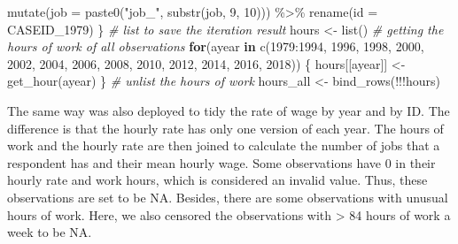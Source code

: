 \documentclass[12pt]{article}
\newenvironment{Shaded}{\begin{snugshade}}{\end{snugshade}}
\newcommand{\AttributeTok}[1]{\textcolor[rgb]{0.77,0.63,0.00}{#1}}
\newcommand{\CommentTok}[1]{\textcolor[rgb]{0.56,0.35,0.01}{\textit{#1}}}
\newcommand{\ControlFlowTok}[1]{\textcolor[rgb]{0.13,0.29,0.53}{\textbf{#1}}}
\newcommand{\DecValTok}[1]{\textcolor[rgb]{0.00,0.00,0.81}{#1}}
\newcommand{\FunctionTok}[1]{\textcolor[rgb]{0.00,0.00,0.00}{#1}}
\newcommand{\NormalTok}[1]{#1}
\newcommand{\OtherTok}[1]{\textcolor[rgb]{0.56,0.35,0.01}{#1}}
\newcommand{\SpecialCharTok}[1]{\textcolor[rgb]{0.00,0.00,0.00}{#1}}
\newcommand{\StringTok}[1]{\textcolor[rgb]{0.31,0.60,0.02}{#1}}
\begin{document}
\begin{Shaded}
\begin{Highlighting}[]
    \FunctionTok{mutate}\NormalTok{(}\AttributeTok{job =} \FunctionTok{paste0}\NormalTok{(}\StringTok{"job\_"}\NormalTok{, }\FunctionTok{substr}\NormalTok{(job, }\DecValTok{9}\NormalTok{, }\DecValTok{10}\NormalTok{))) }\SpecialCharTok{\%\textgreater{}\%}
    \FunctionTok{rename}\NormalTok{(}\AttributeTok{id =}\NormalTok{ CASEID\_1979)}
\NormalTok{\}}
\CommentTok{\# list to save the iteration result}
\NormalTok{hours }\OtherTok{\textless{}{-}} \FunctionTok{list}\NormalTok{()}
\CommentTok{\# getting the hours of work of all observations}
\ControlFlowTok{for}\NormalTok{(ayear }\ControlFlowTok{in} \FunctionTok{c}\NormalTok{(}\DecValTok{1979}\SpecialCharTok{:}\DecValTok{1994}\NormalTok{, }\DecValTok{1996}\NormalTok{, }\DecValTok{1998}\NormalTok{, }\DecValTok{2000}\NormalTok{, }\DecValTok{2002}\NormalTok{, }\DecValTok{2004}\NormalTok{, }\DecValTok{2006}\NormalTok{, }\DecValTok{2008}\NormalTok{, }\DecValTok{2010}\NormalTok{,}
               \DecValTok{2012}\NormalTok{, }\DecValTok{2014}\NormalTok{, }\DecValTok{2016}\NormalTok{, }\DecValTok{2018}\NormalTok{)) \{}
\NormalTok{  hours[[ayear]] }\OtherTok{\textless{}{-}} \FunctionTok{get\_hour}\NormalTok{(ayear)}
\NormalTok{\}}
\CommentTok{\# unlist the hours of work}
\NormalTok{hours\_all }\OtherTok{\textless{}{-}} \FunctionTok{bind\_rows}\NormalTok{(}\SpecialCharTok{!!!}\NormalTok{hours)}
\end{Highlighting}
\end{Shaded}

The same way was also deployed to tidy the rate of wage by year and by ID. The difference is that the hourly rate has only one version of each year. The hours of work and the hourly rate are then joined to calculate the number of jobs that a respondent has and their mean hourly wage. Some observations have 0 in their hourly rate and work hours, which is considered an invalid value. Thus, these observations are set to be NA. Besides, there are some observations with unusual hours of work. Here, we also censored the observations with \textgreater{} 84 hours of work a week to be NA.
\end{document}
